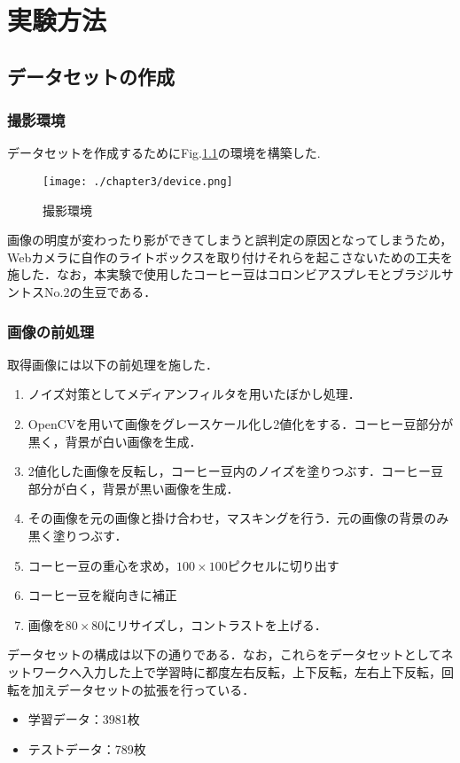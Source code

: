 
\chapter{実験方法}

\section{データセットの作成}
\subsection{撮影環境}
データセットを作成するためにFig.\ref{fig_camera}の環境を構築した.
\begin{figure}[]
  \begin{center}
    \texttt{[image: ./chapter3/device.png]}
    \caption{撮影環境}
    \label{fig_camera}
  \end{center}
\end{figure}

画像の明度が変わったり影ができてしまうと誤判定の原因となってしまうため，Webカメラに自作のライトボックスを取り付けそれらを起こさないための工夫を施した．なお，本実験で使用したコーヒー豆はコロンビアスプレモとブラジルサントスNo.2の生豆である．

\subsection{画像の前処理}
取得画像には以下の前処理を施した．
\begin{enumerate}
\item ノイズ対策としてメディアンフィルタを用いたぼかし処理．
\item OpenCVを用いて画像をグレースケール化し2値化をする．コーヒー豆部分が黒く，背景が白い画像を生成．
\item 2値化した画像を反転し，コーヒー豆内のノイズを塗りつぶす．コーヒー豆部分が白く，背景が黒い画像を生成．
\item その画像を元の画像と掛け合わせ，マスキングを行う．元の画像の背景のみ黒く塗りつぶす．
\item コーヒー豆の重心を求め，$100\times 100$ピクセルに切り出す
\item コーヒー豆を縦向きに補正
\item 画像を$80\times 80$にリサイズし，コントラストを上げる．
\end{enumerate}

データセットの構成は以下の通りである．なお，これらをデータセットとしてネットワークへ入力した上で学習時に都度左右反転，上下反転，左右上下反転，回転を加えデータセットの拡張を行っている．
\begin{itemize}
  \item 学習データ：3981枚
  \item テストデータ：789枚
\end{itemize}

